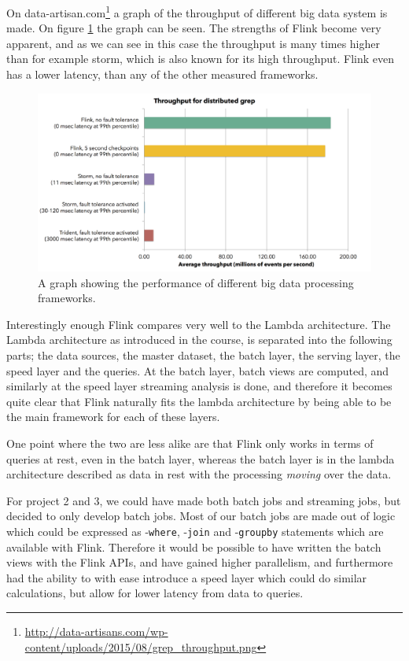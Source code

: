 On data-artisan.com\footnote{ \url{http://data-artisans.com/wp-content/uploads/2015/08/grep_throughput.png}} a graph of the throughput of different big data system is made. On figure \ref{fig:flink_bench} the graph can be seen. The strengths of Flink become very apparent, and as we can see in this case the throughput is many times higher than for example storm, which is also known for its high throughput. Flink even has a lower latency, than any of the other measured frameworks.

\begin{figure}[H]
	\includegraphics[width=\linewidth]{figures/flink_throughput.png}
	\caption{A graph showing the performance of different big data processing frameworks.}
	\label{fig:flink_bench}
\end{figure}

\newpar Interestingly enough Flink compares very well to the Lambda architecture. The Lambda architecture as introduced in the course, is separated into the following parts; the data sources, the master dataset, the batch layer, the serving layer, the speed layer and the queries. At the batch layer, batch views are computed, and similarly at the speed layer streaming analysis is done, and therefore it becomes quite clear that Flink naturally fits the lambda architecture by being able to be the main framework for each of these layers.

One point where the two are less alike are that Flink only works in terms of queries at rest, even in the batch layer, whereas the batch layer is in the lambda architecture described as data in rest with the processing \textit{moving} over the data.

\newpar For project 2 and 3, we could have made both batch jobs and streaming jobs, but decided to only develop batch jobs. Most of our batch jobs are made out of logic which could be expressed as -\texttt{where}, -\texttt{join} and -\texttt{groupby} statements which are available with Flink. Therefore it would be possible to have written the batch views with the Flink APIs, and have gained higher parallelism, and furthermore had the ability to with ease introduce a speed layer which could do similar calculations, but allow for lower latency from data to queries.

